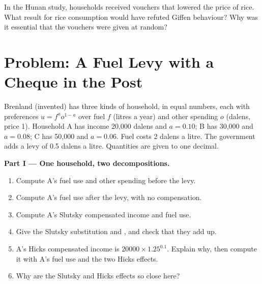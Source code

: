 \begin{exercise}[$\star\star\star$]\label{exo:b1:income-and-substitution-effects:hunan}
In the Hunan study, households received vouchers that lowered the price of
rice. What result for rice consumption would have refuted Giffen
behaviour? Why was it essential that the vouchers were given at random?
\end{exercise}

\section{Problem: A Fuel Levy with a Cheque in the Post}\label{sec:b1:income-and-substitution-effects:problem}

\begin{problem}\label{pb:b1:income-and-substitution-effects:levy}
Brenland (invented) has three kinds of household, in equal numbers, each
with preferences $u = f^{a}o^{1-a}$ over fuel $f$ (litres a year) and other
spending $o$ (dalens, price 1). Household A has income 20,000 dalens and
$a = 0.10$; B has 30,000 and $a = 0.08$; C has 50,000 and $a = 0.06$. Fuel costs
2 dalens a litre. The government adds a levy of 0.5 dalens a litre.
Quantities are given to one decimal.

\medskip\noindent\textbf{Part I --- One household, two decompositions.}
\begin{enumerate}
  \item Compute A's fuel use and other spending before the levy.
  \item Compute A's fuel use after the levy, with no compensation.
  \item Compute A's Slutsky compensated income and fuel use.
  \item Give the Slutsky substitution and , and check that they add up.
  \item A's Hicks compensated income is $20000 \times 1.25^{0.1}$. Explain why, then compute it with A's fuel use and the two Hicks effects.
  \item Why are the Slutsky and Hicks effects so close here?
\end{enumerate}


\end{problem}
